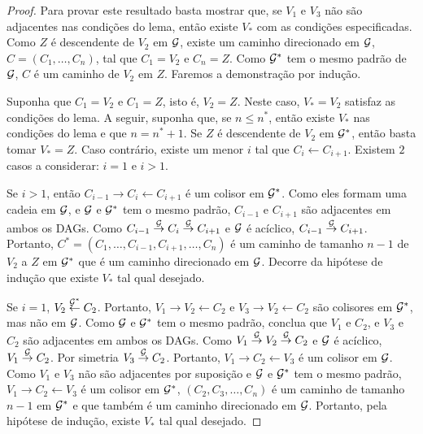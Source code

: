 \begin{proof}
 Para provar este resultado basta mostrar que,
 se $V_1$ e $V_3$ não são adjacentes nas condições do lema,
 então existe $V_*$ com as condições especificadas.
 Como $Z$ é descendente de $V_2$ em ${\mathcal G}$,
 existe um caminho direcionado em ${\mathcal G}$, 
 $C = (C_1, \ldots, C_n)$, tal que 
 $C_1 = V_2$ e $C_n = Z$.
 Como ${\mathcal G}^*$ tem o mesmo padrão de ${\mathcal G}$,
 $C$ é um caminho de $V_2$ em $Z$.
 Faremos a demonstração por indução.
 
 Suponha que $C_1 = V_2$ e $C_1 = Z$,
 isto é, $V_2 = Z$.
 Neste caso, $V_* = V_2$ satisfaz
 as condições do lema.
 A seguir, suponha que, se $n \leq n^*$, então
 existe $V_*$ nas condições do lema e que $n = n^* + 1$.
 Se $Z$ é descendente de $V_2$ em ${\mathcal G}^*$, então
 basta tomar $V_* = Z$.
 Caso contrário, existe um menor $i$ tal que 
 $C_{i} \leftarrow C_{i+1}$.
 Existem $2$ casos a considerar: 
 $i = 1$ e $i > 1$.
 
 Se $i > 1$, então
 $C_{i-1} \rightarrow C_{i} \leftarrow C_{i+1}$ é
 um colisor em ${\mathcal G}^*$. 
 Como eles formam uma cadeia em ${\mathcal G}$, e
 ${\mathcal G}$ e ${\mathcal G}^*$ tem o mesmo padrão,
 $C_{i-1}$ e $C_{i+1}$ são adjacentes em ambos os DAGs.
 Como $C_{i-1} \stackrel{{\mathcal G}}{\rightarrow} C_i \stackrel{{\mathcal G}}{\rightarrow} C_{i+1}$ e
 ${\mathcal G}$ é acíclico, $C_{i-1} \stackrel{{\mathcal G}}{\rightarrow} C_{i+1}$.
 Portanto,
 $C^* = (C_1, \ldots, C_{i-1}, C_{i+1}, \ldots, C_n)$ é
 um caminho de tamanho $n-1$ de $V_2$ a $Z$ em ${\mathcal G}^*$ que
 é um caminho direcionado em ${\mathcal G}$.
 Decorre da hipótese de indução que
 existe $V_*$ tal qual desejado.
 
 Se $i=1$, $V_2 \stackrel{{\mathcal G}^*}{\leftarrow} C_2$.
 Portanto, $V_1 \rightarrow V_2 \leftarrow C_2$ e
 $V_3 \rightarrow V_2 \leftarrow C_2$ são 
 colisores em ${\mathcal G}^*$, mas não em ${\mathcal G}$.
 Como ${\mathcal G}$ e ${\mathcal G}^*$ tem o mesmo padrão,
 conclua que $V_1$ e $C_2$, e $V_3$ e $C_2$ são
 adjacentes em ambos os DAGs.
 Como $V_1 \stackrel{{\mathcal G}}{\rightarrow} V_2 \stackrel{{\mathcal G}}{\rightarrow} C_2$
 e ${\mathcal G}$ é acíclico, $V_1 \stackrel{{\mathcal G}}{\rightarrow} C_2$.
 Por simetria $V_3 \stackrel{{\mathcal G}}{\rightarrow} C_2$.
 Portanto, $V_1 \rightarrow C_2 \leftarrow V_3$ é um colisor em ${\mathcal G}$.
 Como $V_1$ e $V_3$ não são adjacentes por suposição e
 ${\mathcal G}$ e ${\mathcal G}^*$ tem o mesmo padrão,
 $V_1 \rightarrow C_2 \leftarrow V_3$ é um colisor em ${\mathcal G}^*$,
 $(C_2, C_3, \ldots, C_n)$ é um caminho de tamanho $n-1$ em ${\mathcal G}^*$ e
 que também é um caminho direcionado em ${\mathcal G}$. 
 Portanto, pela hipótese de indução, 
 existe $V_*$ tal qual desejado.
\end{proof}

